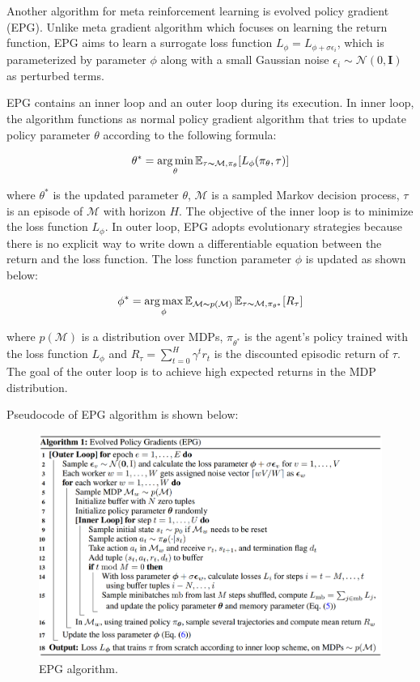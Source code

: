 Another algorithm for meta reinforcement learning is evolved policy gradient (EPG)\cite{epg}. Unlike meta gradient algorithm which focuses on learning the return function, EPG aims to learn a surrogate loss function $L_\phi = L_{\phi + \sigma\epsilon_i}$, which is parameterized by parameter $\phi$ along with a small Gaussian noise $\epsilon_i \sim \mathcal{N}(0, \mathbf{I})$ as perturbed terms.

\par
EPG contains an inner loop and an outer loop during its execution. In inner loop, the algorithm functions as normal policy gradient algorithm that tries to update policy parameter $\theta$ according to the following formula:

\[\theta^* = \operatorname*{arg\,min}_\theta\operatorname{\mathbb{E}}_{\tau\thicksim\mathcal{M},\pi_\theta}[L_\phi(\pi_\theta,\tau)]\]

where $\theta^*$ is the updated parameter $\theta$, $\mathcal{M}$ is a sampled Markov decision process, $\tau$ is an episode of $\mathcal{M}$ with horizon $\textit{H}$. The objective of the inner loop is to minimize the loss function $L_\phi$. In outer loop, EPG adopts evolutionary strategies because there is no explicit way to write down a differentiable equation between the return and the loss function. The loss function parameter $\phi$ is updated as shown below:

\[\phi^* = \operatorname*{arg\,max}_\phi\operatorname{\mathbb{E}}_{\mathcal{M}\thicksim p(\mathcal{M})}\operatorname{\mathbb{E}}_{\tau\thicksim\mathcal{M},\pi_{\theta^*}}[R_\tau]\]

where $p(\mathcal{M})$ is a distribution over MDPs, $\pi_{\theta^*}$ is the agent's policy trained with the loss function $L_\phi$ and $R_\tau = \sum_{t=0}^{H}\gamma^t{r_t}$ is the discounted episodic return of $\tau$. The goal of the outer loop is to achieve high expected returns in the MDP distribution.

\par
Pseudocode of EPG algorithm is shown below:
\begin{figure}[H]
	\includegraphics[scale=0.4]{epg.png}
	\centering
	\caption{EPG algorithm.}
	\label{epg}
\end{figure}


